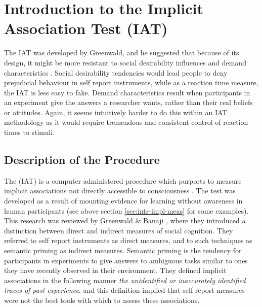 \section{Introduction to the Implicit Association Test (IAT)}

The IAT was developed by Greenwald, and he suggested that because of its design, it might be more resistant to social desirability influences and demand characteristics \cite{Greenwald1998}. 
Social desirability tendencies would lead people to deny prejudicial behaviour in self report instruments, while as a reaction time measure, the IAT is less easy to fake. Demand characteristics result when participants in an experiment give the answers a researcher wants, rather than their real beliefs or attitudes. Again, it seems intuitively harder to do this within an IAT methodology as it would require tremendous and consistent control of reaction times to stimuli. 

\subsection{Description of the Procedure}

The (IAT) is a computer administered procedure which purports to measure implicit associations not directly accessible to consciousness \cite{Greenwald1998}. The test was developed as a result of mounting evidence for learning without awareness in human participants (see above section \ref{sec:intr-impl-meas} for some examples). This research was reviewed by Greenwald \& Banaji \cite{Greenwald1995a}, where they introduced a distinction between direct and indirect measures of social cognition. They referred to self report instruments as direct measures, and to such techniques as semantic priming as indirect measures. Semantic priming is the tendency for participants in experiments to give answers to ambiguous tasks similar to ones they have recently observed in their environment.  They defined implicit associations in the following manner \textit{the unidentified or inaccurately identified traces of past experience}, and this definition implied that self report measures were not the best tools with which to assess these associations. 

